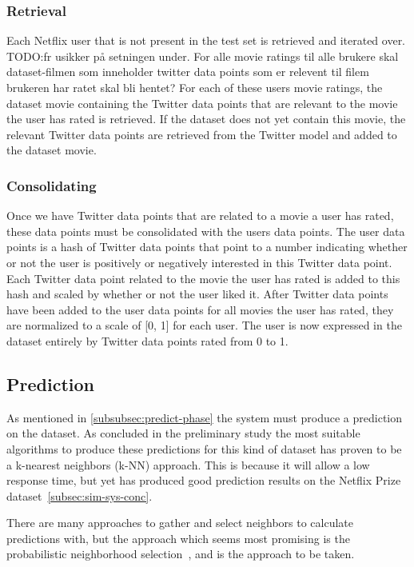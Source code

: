 \subsubsection{Retrieval}
    Each Netflix user that is not present in the test set is retrieved and iterated over.
    TODO:fr usikker på setningen under.
    For alle movie ratings til alle brukere skal dataset-filmen som inneholder twitter data points som er relevent til filem brukeren har ratet skal bli hentet?
    For each of these users movie ratings, the dataset movie containing the Twitter data points that are relevant to the movie the user has rated is retrieved.
    If the dataset does not yet contain this movie, the relevant Twitter data points are retrieved from the Twitter model and added to the dataset movie.

\subsubsection{Consolidating}
	Once we have Twitter data points that are related to a movie a user has rated, these data points must be consolidated with the users data points. The user data points is a hash of Twitter data points that point to a number indicating whether or not the user is positively or negatively interested in this Twitter data point. Each Twitter data point related to the movie the user has rated is added to this hash and scaled by whether or not the user liked it. After Twitter data points have been added to the user data points for all movies the user has rated, they are normalized to a scale of [0, 1] for each user. The user is now expressed in the dataset entirely by Twitter data points rated from 0 to 1.

\subsection{Prediction}\label{algorithm-design:prediction}
As mentioned in \ref{subsubsec:predict-phase} the system must produce a prediction on the dataset. As concluded in the preliminary study the most suitable algorithms to produce these predictions for this kind of dataset has proven to be a k-nearest neighbors (k-NN) approach. This is because it will allow a low response time, but yet has produced good prediction results on the Netflix Prize dataset~\ref{subsec:sim-sys-conc}.

There are many approaches to gather and select neighbors to calculate predictions with, but the approach which seems most promising is the probabilistic neighborhood selection~\cite{probcobfilter}, and is the approach to be taken.

